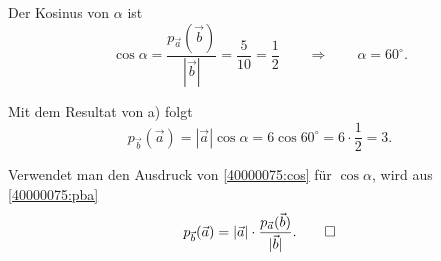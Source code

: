 \begin{loesung}
\begin{teilaufgaben}
\item
Der Kosinus von $\alpha$ ist
\begin{equation}
\cos\alpha
=
\frac{p_{\vec{a}}(\vec{b})}{|\vec{b}|}
=
\frac{5}{10}
=
\frac12
\qquad\Rightarrow\qquad
\alpha = 60^\circ.
\label{40000075:cos}
\end{equation}
\item Mit dem Resultat von a) folgt
\begin{equation}
p_{\vec{b}}(\vec{a})
=
|\vec{a}|\cos\alpha
=
6\cos 60^\circ
=
6\cdot\frac12
=
3.
\label{40000075:pba}
\end{equation}
\item
Verwendet man den Ausdruck von \eqref{40000075:cos} für $\cos\alpha$,
wird aus \eqref{40000075:pba}
\[
p_{\vec{b}}(\vec{a})
=
|\vec{a}|\cdot \frac{p_{\vec{a}}(\vec{b})}{|\vec{b}|}.
\qedhere
\]
\end{teilaufgaben}
\end{loesung}

